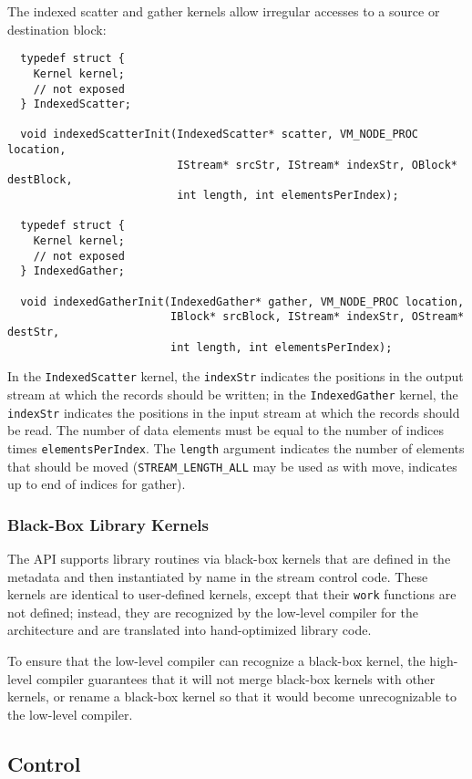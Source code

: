The indexed scatter and gather kernels allow irregular accesses to a source or destination block: 
{\small \begin{verbatim}
  typedef struct {
    Kernel kernel;
    // not exposed
  } IndexedScatter;

  void indexedScatterInit(IndexedScatter* scatter, VM_NODE_PROC location,
                          IStream* srcStr, IStream* indexStr, OBlock* destBlock, 
                          int length, int elementsPerIndex);
                     
  typedef struct {
    Kernel kernel;
    // not exposed
  } IndexedGather;

  void indexedGatherInit(IndexedGather* gather, VM_NODE_PROC location, 
                         IBlock* srcBlock, IStream* indexStr, OStream* destStr, 
                         int length, int elementsPerIndex);
\end{verbatim}}

In the {\tt IndexedScatter} kernel, the {\tt indexStr} indicates the positions in the output stream at which the records should be written; in the {\tt IndexedGather} kernel, the {\tt indexStr} indicates the positions in the input stream at which the records should be read. The number of data elements must be equal to the number of indices times {\tt elementsPerIndex}. The {\tt length} argument indicates the number of elements that should be moved ({\tt STREAM\_LENGTH\_ALL} may be used as with move, indicates up to end of indices for gather).

\subsubsection{Black-Box Library Kernels}
\label{sec:kernelllc}

The API supports library routines via black-box kernels that are defined in the metadata and then instantiated by name in the stream control code.  These kernels are identical to user-defined kernels, except that their {\tt work} functions are not defined; instead, they are 
recognized by the low-level compiler for the architecture and are 
translated into hand-optimized library code.

To ensure that the low-level compiler can recognize a black-box kernel, the high-level compiler guarantees that it will not merge black-box kernels with other kernels, or rename a black-box kernel so that it would become unrecognizable to the low-level compiler.

\subsection{Control}
\label{sec:control}

